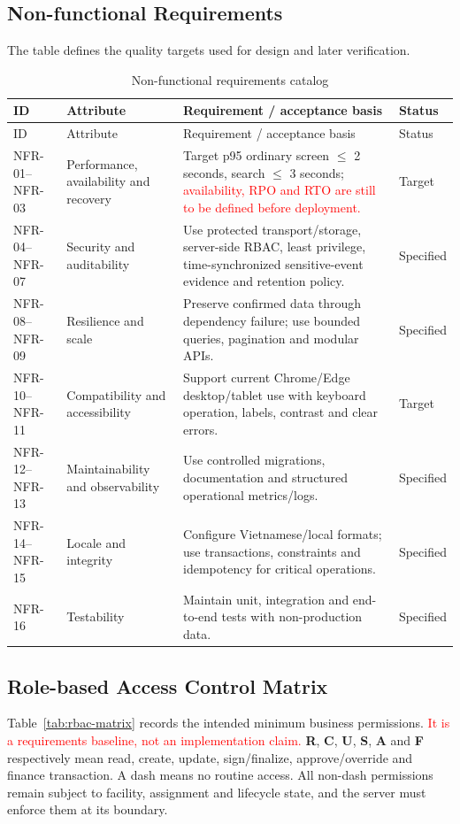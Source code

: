 \documentclass[a4paper,12pt]{article}
\newcommand{\weak}[1]{\textcolor{red}{#1}}
\begin{document}
\subsection{Non-functional Requirements}
The table defines the quality targets used for design and later verification.

\begin{longtable}{@{}p{}p{}p{}p{}@{}}
\caption{Non-functional requirements catalog}\label{tab:nonfunctional-requirements}\\
\toprule ID & Attribute & Requirement / acceptance basis & Status \\
\midrule
\endfirsthead
\toprule ID & Attribute & Requirement / acceptance basis & Status \\
\midrule
\endhead
NFR-01--NFR-03 & Performance, availability and recovery & Target p95 ordinary screen $\leq$ 2 seconds, search $\leq$ 3 seconds; \weak{availability, RPO and RTO are still to be defined before deployment.} & Target \\
NFR-04--NFR-07 & Security and auditability & Use protected transport/storage, server-side RBAC, least privilege, time-synchronized sensitive-event evidence and retention policy. & Specified \\
NFR-08--NFR-09 & Resilience and scale & Preserve confirmed data through dependency failure; use bounded queries, pagination and modular APIs. & Specified \\
NFR-10--NFR-11 & Compatibility and accessibility & Support current Chrome/Edge desktop/tablet use with keyboard operation, labels, contrast and clear errors. & Target \\
NFR-12--NFR-13 & Maintainability and observability & Use controlled migrations, documentation and structured operational metrics/logs. & Specified \\
NFR-14--NFR-15 & Locale and integrity & Configure Vietnamese/local formats; use transactions, constraints and idempotency for critical operations. & Specified \\
NFR-16 & Testability & Maintain unit, integration and end-to-end tests with non-production data. & Specified \\
\bottomrule
\end{longtable}

\subsection{Role-based Access Control Matrix}
Table~\ref{tab:rbac-matrix} records the intended minimum business permissions. \weak{It is a requirements baseline, not an implementation claim.} \textbf{R}, \textbf{C}, \textbf{U}, \textbf{S}, \textbf{A} and \textbf{F} respectively mean read, create, update, sign/finalize, approve/override and finance transaction. A dash means no routine access. All non-dash permissions remain subject to facility, assignment and lifecycle state, and the server must enforce them at its boundary.
\end{document}
